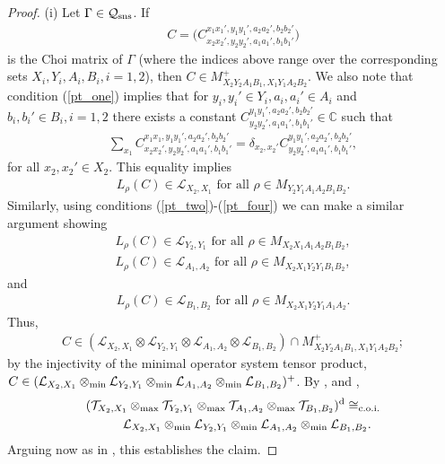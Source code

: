 \documentclass[11pt]{amsart}
\newcommand{\cl}[1]{\mathcal{#1}}
\newcommand{\bb}[1]{\mathbb{#1}}
\begin{document}
\begin{proof}
(i) Let $\Gamma \in \cl{Q}_{\rm sns}$. If 
\begin{gather*}
	C = \big(C_{x_{2}x_{2}', y_{2}y_{2}', a_{1}a_{1}', b_{1}b_{1}'}^{x_{1}x_{1}', y_{1}y_{1}', a_{2}a_{2}', b_{2}b_{2}'}\big)
\end{gather*}
\noindent is the Choi matrix of $\Gamma$ (where the indices above range over the corresponding sets $X_{i}, Y_{i}, A_{i}, B_{i}, i=1, 2$), then $C \in M_{X_{2}Y_{2}A_{1}B_{1}, X_{1}Y_{1}A_{2}B_{2}}^{+}$. We also note that condition (\ref{pt_one}) implies that for $y_{i}, y_{i}' \in Y_{i}, a_{i}, a_{i}' \in A_{i}$ and $b_{i}, b_{i}' \in B_{i}, i = 1, 2$ there exists a constant $C_{y_{2}y_{2}', a_{1}a_{1}', b_{1}b_{1}'}^{y_{1}y_{1}', a_{2}a_{2}', b_{2}b_{2}'} \in \bb{C}$ such that 
\begin{gather*}
	\sum\limits_{x_{1}}C_{x_{2}x_{2}', y_{2}y_{2}', a_{1}a_{1}', b_{1}b_{1}'}^{x_{1}x_{1}, y_{1}y_{1}', a_{2}a_{2}', b_{2}b_{2}'} = \delta_{x_{2}, x_{2}'}C_{y_{2}y_{2}', a_{1}a_{1}', b_{1}b_{1}'}^{y_{1}y_{1}', a_{2}a_{2}', b_{2}b_{2}'},
\end{gather*}
\noindent for all $x_{2}, x_{2}' \in X_{2}$. This equality implies
\begin{gather*}
	L_{\rho}(C) \in \cl{L}_{X_{2}, X_{1}} \text{ for all } \rho \in M_{Y_{2}Y_{1}A_{1}A_{2}B_{1}B_{2}}.
\end{gather*}
Similarly, using conditions (\ref{pt_two})-(\ref{pt_four}) we can make a similar argument showing
\begin{gather*}
	L_{\rho}(C) \in \cl{L}_{Y_{2}, Y_{1}} \text{ for all } \rho \in M_{X_{2}X_{1}A_{1}A_{2}B_{1}B_{2}}, 
\\	L_{\rho}(C) \in \cl{L}_{A_{1}, A_{2}} \text{ for all } \rho \in M_{X_{2}X_{1}Y_{2}Y_{1}B_{1}B_{2}},
\end{gather*}
\noindent and
\begin{gather*}
	L_{\rho}(C) \in \cl{L}_{B_{1}, B_{2}} \text{ for all } \rho \in M_{X_{2}X_{1}Y_{2}Y_{1}A_{1}A_{2}}.
\end{gather*}
\noindent Thus, 
\begin{gather*}
	C \in (\cl{L}_{X_{2}, X_{1}}\otimes \cl{L}_{Y_{2}, Y_{1}}\otimes \cl{L}_{A_{1}, A_{2}}\otimes \cl{L}_{B_{1}, B_{2}}) \cap M_{X_{2}Y_{2}A_{1}B_{1}, X_{1}Y_{1}A_{2}B_{2}}^{+};
\end{gather*}
\noindent by the injectivity of the minimal operator system tensor product, $C \in (\cl{L}_{X_{2}, X_{1}}\otimes_{\rm min} \cl{L}_{Y_{2}, Y_{1}}\otimes_{\rm min} \cl{L}_{A_{1}, A_{2}}\otimes_{\rm min} \cl{L}_{B_{1}, B_{2}})^{+}$. By \cite[Proposition 1.9]{fp}, and \cite[Proposition 5.5]{tt}, 
\begin{gather*}
	(\cl{T}_{X_{2}, X_{1}}\otimes_{\rm max} \cl{T}_{Y_{2}, Y_{1}}\otimes_{\rm max} \cl{T}_{A_{1}, A_{2}}\otimes_{\rm max} \cl{T}_{B_{1}, B_{2}})^{\rm d} \cong_{\rm c.o.i.} 
\\	\;\;\;\;\;\;\;\; \cl{L}_{X_{2}, X_{1}}\otimes_{\rm min} \cl{L}_{Y_{2}, Y_{1}}\otimes_{\rm min} \cl{L}_{A_{1}, A_{2}}\otimes_{\rm min} \cl{L}_{B_{1}, B_{2}}.
\end{gather*}
Arguing now as in \cite[Theorem 6.2]{tt}, this establishes the claim.


\end{proof}
\end{document}
